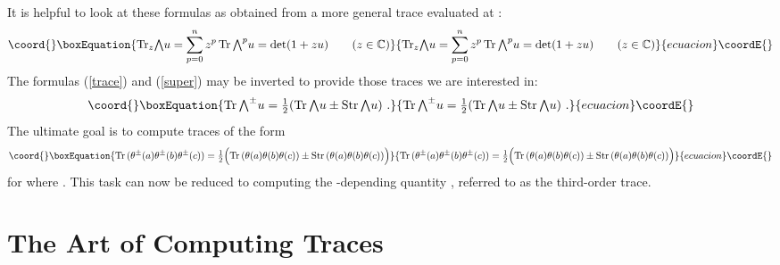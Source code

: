 \documentclass[11pt,a4paper]{article}
\providecommand{\hf}{{\textstyle\frac{1}{2}}}
\providecommand{\CC}{\mathbb{C}}
\providecommand{\bw}{{\textstyle\bigwedge}}
\providecommand{\ah}{\theta(a)}
\providecommand{\bh}{\theta(b)}
\providecommand{\ch}{\theta(c)}
\providecommand{\Tr}{\mbox{Tr}\,}
\providecommand{\Str}{\mbox{Str}\,}
\providecommand{\Tz}{\mbox{Tr}_z}
\begin{document}
It is helpful to look at these formulas as obtained from a more general
trace evaluated at \coordHE{}:
\begin{equation}\coord{}\boxEquation{
  \label{Ttz}
     \Tz \bw u = \sum_{p=0}^n z^p\,\Tr\bw^p u = \mbox{det}(1+zu)
   \qquad(z\in\CC)
}{
  \Tz \bw u = \sum_{p=0}^n z^p\,\Tr\bw^p u = \mbox{det}(1+zu)
   \qquad(z\in\CC)
}{ecuacion}\coordE{}\end{equation}
The formulas (\ref{trace}) and (\ref{super}) may be inverted to provide
those traces we are interested in:
\begin{equation}\coord{}\boxEquation{
  \label{pmin}
  \Tr\bw^\pm u =\hf(\Tr\bw u\pm\Str\bw u)\ .
}{
  \Tr\bw^\pm u =\hf(\Tr\bw u\pm\Str\bw u)\ .
}{ecuacion}\coordE{}\end{equation}
The ultimate goal is to compute traces of the form 
\begin{equation}\coord{}\boxEquation{
\label{tpm}
\Tr(\theta^\pm(a)\theta^\pm(b)\theta^\pm(c))=
\hf\Big(\Tr(\ah\bh\ch)\pm\Str(\ah\bh\ch)\Big)
}{
\Tr(\theta^\pm(a)\theta^\pm(b)\theta^\pm(c))=
\hf\Big(\Tr(\ah\bh\ch)\pm\Str(\ah\bh\ch)\Big)
}{ecuacion}\coordE{}\end{equation}
for \coordHE{} where \coordHE{}.
This task can now be reduced to computing the \coordHE{}-depending quantity 
\myHighlight{$\Tz (\ah\bh\ch)$}\coordHE{}, referred to as the third-order trace.

\section{The Art of Computing Traces}
\end{document}
